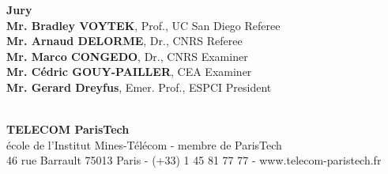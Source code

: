 \documentclass[12pt,a4paper]{book}
\begin{document}
%
%
%
\vfill
%
%
%
\flushleft
\begin{minipage}{.9\textwidth}	%
{\bf Jury}\\
{\bf Mr. Bradley VOYTEK}, {\small Prof., UC San Diego}
	\hfill Referee\\
{\bf Mr. Arnaud DELORME}, {\small Dr., CNRS}
	\hfill Referee\\
{\bf Mr. Marco CONGEDO}, {\small Dr., CNRS}
	\hfill Examiner\\
{\bf Mr. C\'{e}dric GOUY-PAILLER}, {\small CEA}
	\hfill Examiner\\
{\bf Mr. Gerard Dreyfus}, {\small Emer. Prof., ESPCI}
	\hfill President\\

\end{minipage}\\
%
%
%
\vspace{-.3cm}
%
%
%
{\centering
{\bf TELECOM ParisTech}\\
{\small \'{e}cole de l'Institut Mines-T\'{e}l\'{e}com - membre de ParisTech}\\
{\tiny 46 rue Barrault 75013 Paris - (+33) 1 45 81 77 77 - www.telecom-paristech.fr}}
%
%
%
%
\end{document}
